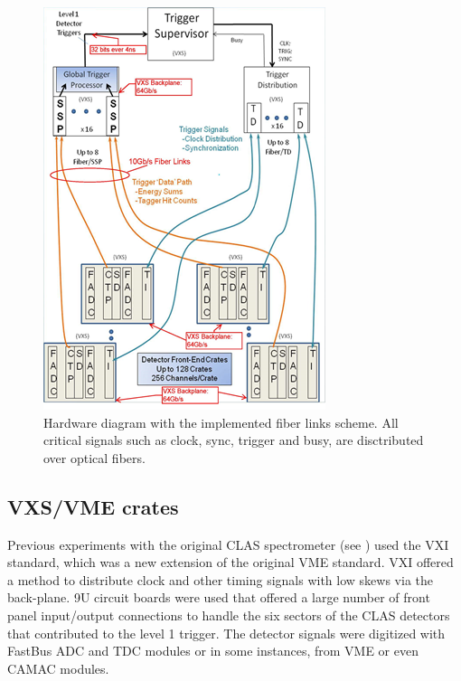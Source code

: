 \begin{figure}[hbt]
	\centering
	\includegraphics[width=1.0\columnwidth,keepaspectratio]{img/hardware_diagram.png}
	\caption{Hardware diagram with the implemented fiber links scheme. All critical signals such as clock, sync, trigger and busy, are disctributed over optical fibers.}
	\label{fig:hardwarediagram}
\end{figure}


\subsection{VXS/VME crates}

Previous experiments with the original CLAS spectrometer (see \cite{clas-nim}) used the VXI standard, which was a new extension of the original VME standard. VXI offered a method to distribute clock and other timing signals with low skews via the back-plane. 9U circuit boards were used that offered a large number of front panel input/output connections to handle the six sectors of the CLAS detectors that contributed to the level 1 trigger. The detector signals were digitized with FastBus ADC and TDC modules or in some instances, from VME or even CAMAC modules. 

